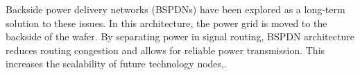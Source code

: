 Backside power delivery networks (BSPDNs) have been explored as a long-term solution to these issues. In this architecture, the power grid is moved to the backside of the wafer. By separating power in signal routing, BSPDN architecture reduces routing congestion and allows for reliable power transmission. This increases the scalability of future technology nodes\cite{10631463},\cite{8932458}.


